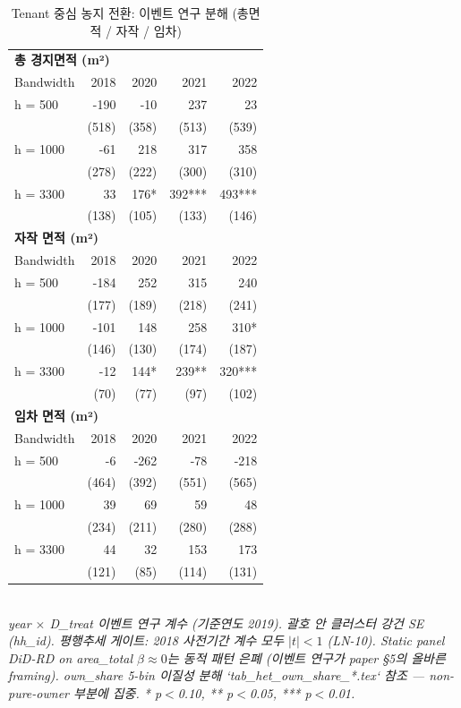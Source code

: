 \begin{table}[t]
\centering
\caption{Tenant 중심 농지 전환: 이벤트 연구 분해 (총면적 / 자작 / 임차)}
\label{tab:stabilization_ko}
\begin{tabular}{lrrrr}
\toprule
\multicolumn{5}{l}{\textbf{총 경지면적 (m²)}} \\
Bandwidth & 2018 & 2020 & 2021 & 2022 \\
\midrule
h = 500 & -190 & -10 & 237 & 23 \\
    & (518) & (358) & (513) & (539) \\
h = 1000 & -61 & 218 & 317 & 358 \\
    & (278) & (222) & (300) & (310) \\
h = 3300 & 33 & 176* & 392*** & 493*** \\
    & (138) & (105) & (133) & (146) \\
\midrule
\multicolumn{5}{l}{\textbf{자작 면적 (m²)}} \\
Bandwidth & 2018 & 2020 & 2021 & 2022 \\
\midrule
h = 500 & -184 & 252 & 315 & 240 \\
    & (177) & (189) & (218) & (241) \\
h = 1000 & -101 & 148 & 258 & 310* \\
    & (146) & (130) & (174) & (187) \\
h = 3300 & -12 & 144* & 239** & 320*** \\
    & (70) & (77) & (97) & (102) \\
\midrule
\multicolumn{5}{l}{\textbf{임차 면적 (m²)}} \\
Bandwidth & 2018 & 2020 & 2021 & 2022 \\
\midrule
h = 500 & -6 & -262 & -78 & -218 \\
    & (464) & (392) & (551) & (565) \\
h = 1000 & 39 & 69 & 59 & 48 \\
    & (234) & (211) & (280) & (288) \\
h = 3300 & 44 & 32 & 153 & 173 \\
    & (121) & (85) & (114) & (131) \\
\midrule
\bottomrule
\end{tabular}
\\
\footnotesize\textit{year $\times$ D\_treat 이벤트 연구 계수 (기준연도 2019). 괄호 안 클러스터 강건 SE (hh\_id). 평행추세 게이트: 2018 사전기간 계수 모두 $|t|<1$ (LN-10). Static panel DiD-RD on area\_total $\beta \approx 0$는 동적 패턴 은폐 (이벤트 연구가 paper \S5의 올바른 framing). own\_share 5-bin 이질성 분해 `tab\_het\_own\_share_*.tex` 참조 — non-pure-owner 부분에 집중. * p$<$0.10, ** p$<$0.05, *** p$<$0.01.}
\end{table}

